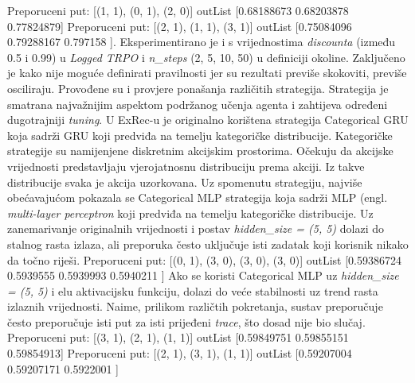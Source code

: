 Preporuceni put: [(1, 1), (0, 1), (2, 0)]\newline
outList [0.68188673 0.68203878 0.77824879]\newline
Preporuceni put: [(2, 1), (1, 1), (3, 1)]\newline
outList [0.75084096 0.79288167 0.797158 ].\newline
Eksperimentirano je i s vrijednostima \textit{discounta} (između 0.5 i 0.99) u \textit{Logged TRPO} i \textit{n\_steps} (2, 5, 10, 50) u definiciji okoline. Zaključeno je kako nije moguće definirati pravilnosti jer su rezultati previše skokoviti, previše osciliraju.\newline
Provođene su i provjere ponašanja različitih strategija. Strategija je smatrana najvažnijim aspektom podržanog učenja agenta i zahtijeva određeni dugotrajniji \textit{tuning}. U ExRec-u je originalno korištena strategija Categorical GRU koja sadrži GRU koji predviđa na temelju kategoričke distribucije. Kategoričke strategije su namijenjene diskretnim akcijskim prostorima. Očekuju da akcijske vrijednosti predstavljaju vjerojatnosnu distribuciju prema akciji. Iz takve distribucije svaka je akcija uzorkovana. \newline
Uz spomenutu strategiju, najviše obećavajućom pokazala se Categorical MLP strategija koja sadrži MLP (engl. \textit{multi-layer perceptron} koji predviđa na temelju kategoričke distribucije. Uz zanemarivanje originalnih vrijednosti i postav \textit{hidden\_size = (5, 5)} dolazi do stalnog rasta izlaza, ali preporuka često uključuje isti zadatak koji korisnik nikako da točno riješi.\newline
Preporuceni put: [(0, 1), (3, 0), (3, 0), (3, 0)]\newline
outList [0.59386724 0.5939555  0.5939993  0.5940211 ]\newline
Ako se koristi Categorical MLP uz \textit{hidden\_size = (5, 5)} i elu aktivacijsku funkciju, dolazi do veće stabilnosti uz trend rasta izlaznih vrijednosti. Naime, prilikom različtih pokretanja, sustav preporučuje često preporučuje isti put za isti prijeđeni \textit{trace}, što dosad nije bio slučaj.\newline
Preporuceni put: [(3, 1), (2, 1), (1, 1)]\newline
outList [0.59849751 0.59855151 0.59854913]\newline
Preporuceni put: [(2, 1), (3, 1), (1, 1)]\newline
outList [0.59207004 0.59207171 0.5922001 ]\newline

